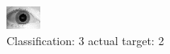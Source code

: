 \begin{figure}[h!]
\begin{center}
\includegraphics[width=0.60\columnwidth]{figures/ID1660_class_3_target_2.png}
\end{center}
\caption{ Classification: 3 actual target: 2}
\label{fig:ID1660_class_3_target_2}
\end{figure}
